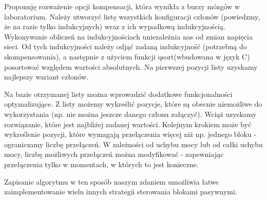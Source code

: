 \documentclass[12pt,a4paper]{article}
\begin{document}
Proponuję rozważenie opcji kompensacji, która wynikła z burzy mózgów w laboratorium. Należy utworzyć listę wszystkich konfiguracji członów (powiedzmy, że na razie tylko indukcyjnych) wraz z ich wypadkową indukcyjnością. Wykonywanie obliczeń na indukcyjnościach uniezależnia nas od zmian napięcia sieci. Od tych indukcyjności należy odjąć zadaną indukcyjność (potrzebną do skompensowania), a następnie z użyciem funkcji qsort(wbudowana w język C) posortować względem wartości absolutnych. Na pierwszej pozycji listy uzyskamy najlepszy wariant członów.

Na bazie otrzymanej listy można wprowadzić dodatkowe funkcjonalności optymalizujące. Z listy możemy wykreślić pozycje, które są obecnie niemożliwe do wykorzystania (np. nie można jeszcze danego członu załączyć). Wciąż uzyskamy rozwiązanie, które jest najbliżej zadanej wartości. Kolejnym krokiem może być wykreślenie pozycji, które wymagają przełączenia więcej niż np. jednego bloku - ograniczamy liczbę przełączeń. W zależności od uchybu mocy lub od całki uchybu mocy, liczbę możliwych przełączeń można modyfikować - zapewniając przełączenia tylko w momentach, w których to jest konieczne.

Zapisanie algorytmu w ten sposób naszym zdaniem umożliwia łatwe zaimplementowanie wielu innych strategii sterowania blokami pasywnymi.
\end{document}
